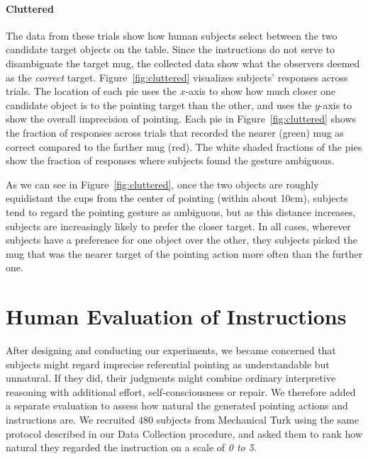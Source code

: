 \documentclass[letterpaper]{article} %
\begin{document}
\paragraph{Cluttered}
The data from these trials show how human subjects select between the two candidate target objects on the table. Since the instructions do not serve to disambiguate the target mug, the collected data show what the observers deemed as the \textit{correct} target.  Figure~\ref{fig:cluttered} visualizes subjects' responses across trials.  The location of each pie uses the $x$-axis to show how much closer one candidate object is to the pointing target than the other, and uses the $y$-axis to show the overall imprecision of pointing.  Each pie in Figure~\ref{fig:cluttered} shows the fraction of responses across trials that recorded the nearer (green) mug as correct compared to the farther mug (red). The white shaded fractions of the pies show the fraction of responses where subjects found the gesture ambiguous.

As we can see in Figure~\ref{fig:cluttered}, once the two objects are roughly equidistant the cups from the center of pointing (within about 10cm), subjects tend to regard the pointing gesture as ambiguous, but as this distance increases, subjects are increasingly likely to prefer the closer target.  In all cases, wherever subjects have a preference for one object over the other, they subjects picked the mug that was the nearer target of the pointing action more often than the further one.




\section{Human Evaluation of Instructions}

After designing and conducting our experiments, we became concerned that subjects might regard imprecise referential pointing as understandable but unnatural.  If they did, their judgments might combine ordinary interpretive reasoning with additional effort, self-consciousness or repair.  We therefore added a separate evaluation to assess how natural the generated pointing actions and instructions are. We recruited 480 subjects from Mechanical Turk using the same protocol described in our Data Collection procedure, and asked them to rank how natural they regarded the instruction on a scale of \textit{0 to 5}. 
\end{document}
